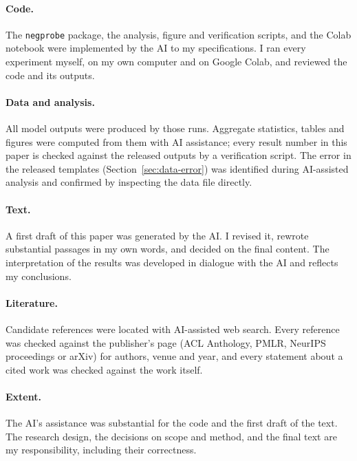 \documentclass{article}
\begin{document}
\paragraph{Code.} The \texttt{negprobe} package, the analysis, figure and verification scripts, and
the Colab notebook were implemented by the AI to my specifications. I ran every experiment myself, on my
own computer and on Google Colab, and reviewed the code and its outputs.

\paragraph{Data and analysis.} All model outputs were produced by those runs. Aggregate statistics,
tables and figures were computed from them with AI assistance; every result number in this paper is checked against the released outputs by a verification script. The error in the released templates
(Section~\ref{sec:data-error}) was identified during AI-assisted analysis and confirmed by inspecting
the data file directly.

\paragraph{Text.} A first draft of this paper was generated by the AI. I revised it, rewrote
substantial passages in my own words, and decided on the final content. The interpretation of the
results was developed in dialogue with the AI and reflects my conclusions.

\paragraph{Literature.} Candidate references were located with AI-assisted web search. Every reference was checked against the publisher's page (ACL Anthology, PMLR, NeurIPS proceedings or arXiv) for authors, venue and year, and every statement about a cited work was checked against the work itself.

\paragraph{Extent.} The AI's assistance was substantial for the code and the first draft of the text.
The research design, the decisions on scope and method, and the final text are my responsibility,
including their correctness.
\end{document}
